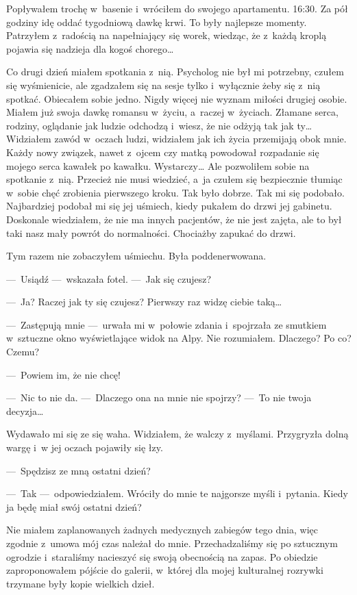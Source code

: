 Popływałem trochę w~basenie i~wróciłem do swojego apartamentu. 16:30. Za pół godziny idę oddać tygodniową dawkę krwi. To były najlepsze momenty. Patrzyłem z~radością na napełniający się worek, wiedząc, że z~każdą kroplą pojawia się nadzieja dla kogoś chorego…

Co drugi dzień miałem spotkania z~nią. Psycholog nie był mi potrzebny, czułem się wyśmienicie, ale zgadzałem się na sesje tylko i~wyłącznie żeby się z~nią spotkać. Obiecałem sobie jedno. Nigdy więcej nie wyznam miłości drugiej osobie. Miałem już swoja dawkę romansu w~życiu, a~raczej w~życiach. Złamane serca, rodziny, oglądanie jak ludzie odchodzą i~wiesz, że nie odżyją tak jak ty… Widziałem zawód w~oczach ludzi, widziałem jak ich życia przemijają obok mnie. Każdy nowy związek, nawet z~ojcem czy matką powodował rozpadanie się mojego serca kawałek po kawałku. Wystarczy… Ale pozwoliłem sobie na spotkanie z~nią. Przecież nie musi wiedzieć, a~ja czułem się bezpiecznie tłumiąc w~sobie chęć zrobienia pierwszego kroku. Tak było dobrze. Tak mi się podobało. Najbardziej podobał mi się jej uśmiech, kiedy pukałem do drzwi jej gabinetu. Doskonale wiedziałem, że nie ma innych pacjentów, że nie jest zajęta, ale to był taki nasz mały powrót do normalności. Chociażby zapukać do drzwi. 

Tym razem nie zobaczyłem uśmiechu. Była poddenerwowana. 

---~Usiądź ---~wskazała fotel. ---~Jak się czujesz?

---~Ja? Raczej jak ty się czujesz? Pierwszy raz widzę ciebie taką…

---~Zastępują mnie ---~urwała mi w~połowie zdania i~spojrzała ze smutkiem w~sztuczne okno wyświetlające widok na Alpy. 
Nie rozumiałem. Dlaczego? Po co? Czemu?

---~Powiem im, że nie chcę! 

---~Nic to nie da. ---~Dlaczego ona na mnie nie spojrzy? ---~To nie twoja decyzja…

Wydawało mi się ze się waha. Widziałem, że walczy z~myślami. Przygryzła dolną wargę i~w jej oczach pojawiły się łzy. 

---~Spędzisz ze mną ostatni dzień?

---~Tak ---~odpowiedziałem. Wróciły do mnie te najgorsze myśli i~pytania. Kiedy ja będę miał swój ostatni dzień?

Nie miałem zaplanowanych żadnych medycznych zabiegów tego dnia, więc zgodnie z~umowa mój czas należał do mnie. Przechadzaliśmy się po sztucznym ogrodzie i~staraliśmy nacieszyć się swoją obecnością na zapas. Po obiedzie zaproponowałem pójście do galerii, w~której dla mojej kulturalnej rozrywki trzymane były kopie wielkich dzieł.

